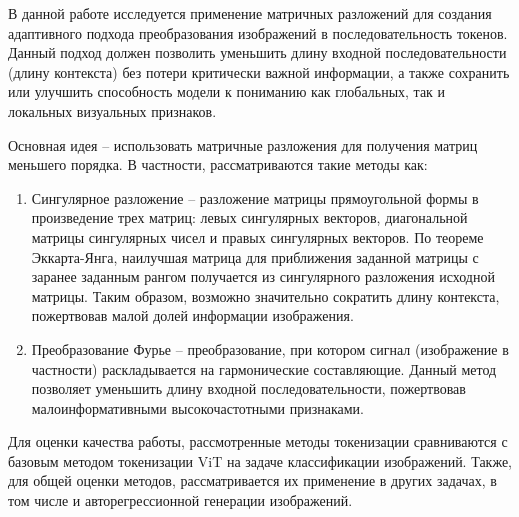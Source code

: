 \documentclass[times,specification,annotation]{itmo-student-thesis}
\begin{document}
В данной работе исследуется применение матричных разложений для создания адаптивного подхода преобразования изображений в последовательность токенов. Данный подход должен позволить уменьшить длину входной последовательности (длину контекста) без потери критически важной информации, а также сохранить или улучшить способность модели к пониманию как глобальных, так и локальных визуальных признаков. 

Основная идея – использовать матричные разложения для получения матриц меньшего порядка. В частности, рассматриваются такие методы как:

\begin{enumerate}
    \item Сингулярное разложение – разложение матрицы прямоугольной формы в произведение трех матриц: левых сингулярных векторов, диагональной матрицы сингулярных чисел и правых сингулярных векторов. По теореме Эккарта-Янга, наилучшая матрица для приближения заданной матрицы с заранее заданным рангом получается из сингулярного разложения исходной матрицы. Таким образом, возможно значительно сократить длину контекста, пожертвовав малой долей информации изображения.
    \item Преобразование Фурье – преобразование, при котором сигнал (изображение в частности) раскладывается на гармонические составляющие. Данный метод позволяет уменьшить длину входной последовательности, пожертвовав малоинформативными высокочастотными признаками.
\end{enumerate}

Для оценки качества работы, рассмотренные методы токенизации сравниваются с базовым методом токенизации ViT на задаче классификации изображений. Также, для общей оценки методов, рассматривается их применение в других задачах, в том числе и авторегрессионной генерации изображений.
\end{document}
